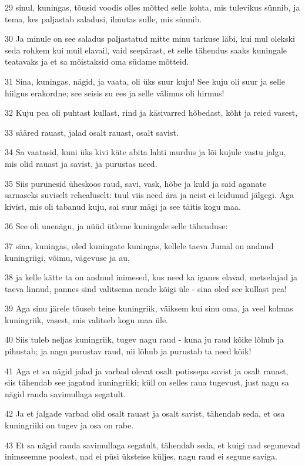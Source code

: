 \par 29 sinul, kuningas, tõusid voodis olles mõtted selle kohta, mis tulevikus sünnib, ja tema, kes paljastab saladusi, ilmutas sulle, mis sünnib.
\par 30 Ja minule on see saladus paljastatud mitte minu tarkuse läbi, kui mul olekski seda rohkem kui muil elavail, vaid seepärast, et selle tähendus saaks kuningale teatavaks ja et sa mõistaksid oma südame mõtteid.
\par 31 Sina, kuningas, nägid, ja vaata, oli üks suur kuju! See kuju oli suur ja selle hiilgus erakordne; see seisis su ees ja selle välimus oli hirmus!
\par 32 Kuju pea oli puhtast kullast, rind ja käsivarred hõbedast, kõht ja reied vasest,
\par 33 sääred rauast, jalad osalt rauast, osalt savist.
\par 34 Sa vaatasid, kuni üks kivi käte abita lahti murdus ja lõi kujule vastu jalgu, mis olid rauast ja savist, ja purustas need.
\par 35 Siis purunesid üheskoos raud, savi, vask, hõbe ja kuld ja said aganate sarnaseks suviselt rehealuselt: tuul viis need ära ja neist ei leidunud jälgegi. Aga kivist, mis oli tabanud kuju, sai suur mägi ja see täitis kogu maa.
\par 36 See oli unenägu, ja nüüd ütleme kuningale selle tähenduse:
\par 37 sina, kuningas, oled kuningate kuningas, kellele taeva Jumal on andnud kuningriigi, võimu, vägevuse ja au,
\par 38 ja kelle kätte ta on andnud inimesed, kus need ka iganes elavad, metselajad ja taeva linnud, pannes sind valitsema nende kõigi üle - sina oled see kullast pea!
\par 39 Aga sinu järele tõuseb teine kuningriik, väiksem kui sinu oma, ja veel kolmas kuningriik, vasest, mis valitseb kogu maa üle.
\par 40 Siis tuleb neljas kuningriik, tugev nagu raud - kuna ju raud kõike lõhub ja pihustab; ja nagu purustav raud, nii lõhub ja purustab ta need kõik!
\par 41 Aga et sa nägid jalad ja varbad olevat osalt potissepa savist ja osalt rauast, siis tähendab see jagatud kuningriiki; küll on selles raua tugevust, just nagu sa nägid rauda savimullaga segatult.
\par 42 Ja et jalgade varbad olid osalt rauast ja osalt savist, tähendab seda, et osa kuningriiki on tugev ja osa on rabe.
\par 43 Et sa nägid rauda savimullaga segatult, tähendab seda, et kuigi nad segunevad inimseemne poolest, nad ei püsi üksteise küljes, nagu raud ei segune saviga.
